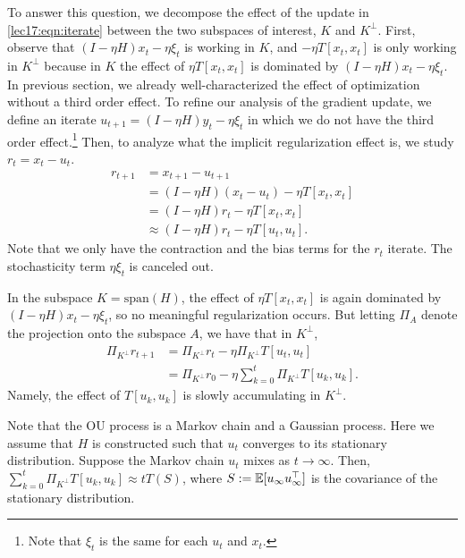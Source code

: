To answer this question, we decompose the effect of the update in \eqref{lec17:eqn:iterate} between the two subspaces of interest, $K$ and $K^\perp$. First, observe that $(I-\eta H)x_t - \eta \xi_t$ is working in $K$, and $- \eta T [x_t,x_t]$ is only working in $K^\perp$ because in $K$ the effect of $\eta T [x_t,x_t]$ is dominated by $(I-\eta H)x_t - \eta \xi_t$. In previous section, we already well-characterized the effect of optimization without a third order effect. To refine our analysis of the gradient update, we define an iterate $u_{t+1} = (I - \eta H)y_t - \eta \xi_t$ in which we do not have the third order effect.\footnote{Note that $\xi_t$ is the same for each $u_t$ and $x_t$.} Then, to analyze what the implicit regularization effect is, we study $r_t = x_t - u_t$.
\begin{align*}
r_{t + 1} &= x_{t+1} - u_{t+1}\\
&= (I-\eta H)(x_t - u_t) - \eta T[x_t,x_t]\\
&= (I-\eta H)r_t - \eta T[x_t,x_t]\\
&\approx (I-\eta H)r_t - \eta T[u_t,u_t].
\end{align*}
Note that we only have the contraction and the bias terms for the $r_t$ iterate. The stochasticity term $\eta \xi_t$ is canceled out. 

In the subspace $K = \text{span}(H)$, the effect of $\eta T [x_t,x_t]$ is again dominated by $(I-\eta H)x_t - \eta \xi_t$, so no meaningful regularization occurs. But letting $\Pi_{A}$ denote the projection onto the subspace $A$, we have that in $K^\perp$,
\begin{align}
\Pi_{K^\perp}r_{t+1} &= \Pi_{K^\perp}r_t - \eta \Pi_{K^\perp} T[u_t,u_t]\\
&=\Pi_{K^\perp}r_0 - \eta \sum_{k=0}^{t}\Pi_{K^\perp}T[u_k,u_k].
\end{align}
Namely, the effect of $T[u_k,u_k]$ is slowly accumulating in ${K^\perp}$.

Note that the OU process is a Markov chain and a Gaussian process. Here we assume that $H$ is constructed such that $u_t$ converges to its stationary distribution. Suppose the Markov chain $u_t$ mixes as $t\rightarrow \infty$. Then, $\sum_{k=0}^{t}\Pi_{K^\perp}T[u_k,u_k] \approx tT(S)$, where $S:=\operatorname*{\mathbb{E}}[u_{\infty}u_{\infty}^\top]$ is the covariance of the stationary distribution.


